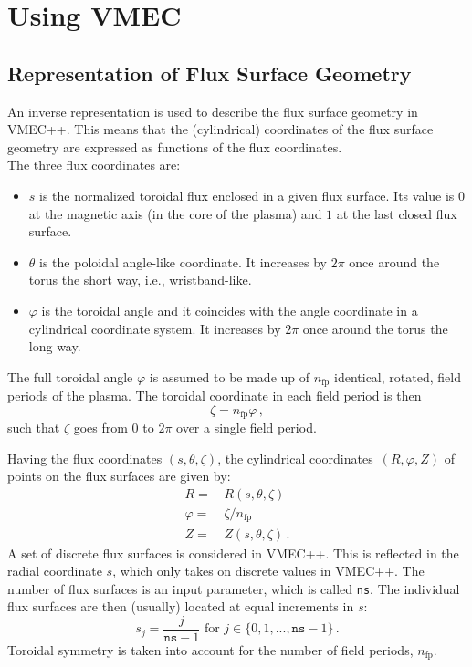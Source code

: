 \chapter{Using VMEC}

\section{Representation of Flux Surface Geometry}
%
An inverse representation is used to describe the flux surface geometry in VMEC++.
This means that the (cylindrical) coordinates of the flux surface geometry
are expressed as functions of the flux coordinates.
\\
The three flux coordinates are:
\begin{itemize}
 \item $s$ is the normalized toroidal flux enclosed in a given flux surface.
       Its value is $0$ at the magnetic axis (in the core of the plasma) and $1$ at the last closed flux surface.
 \item $\theta$ is the poloidal angle-like coordinate.
       It increases by $2 \pi$ once around the torus the short way, i.e., wristband-like.
 \item $\varphi$ is the toroidal angle
       and it coincides with the angle coordinate in a cylindrical coordinate system.
       It increases by $2 \pi$ once around the torus the long way.
\end{itemize}
The full toroidal angle $\varphi$ is assumed to be made up of $n_\textrm{fp}$ identical, rotated, field periods of the plasma.
The toroidal coordinate in each field period is then
\begin{equation}
 \zeta = n_\textrm{fp} \varphi \, ,
\end{equation}
such that $\zeta$ goes from $0$ to $2 \pi$ over a single field period.

Having the flux coordinates $(s, \theta, \zeta)$, the cylindrical coordinates~$(R, \varphi, Z)$ of points on the flux surfaces
are given by:
\begin{align}
 R       =&\, R(s, \theta, \zeta) \nonumber \\
 \varphi =&\, \zeta / n_\textrm{fp} \\
 Z       =&\, Z(s, \theta, \zeta) \nonumber \, .
\end{align}
A set of discrete flux surfaces is considered in VMEC++.
This is reflected in the radial coordinate $s$, which only takes on discrete values in VMEC++.
The number of flux surfaces is an input parameter, which is called \texttt{ns}.
The individual flux surfaces are then (usually) located at equal increments in $s$:
\begin{equation}
 s_j = \frac{j}{\texttt{ns} - 1} \textrm{ for } j \in \{0, 1, ..., \texttt{ns} - 1\} \, .
\end{equation}
Toroidal symmetry is taken into account for the number of field periods, $n_\textrm{fp}$.

